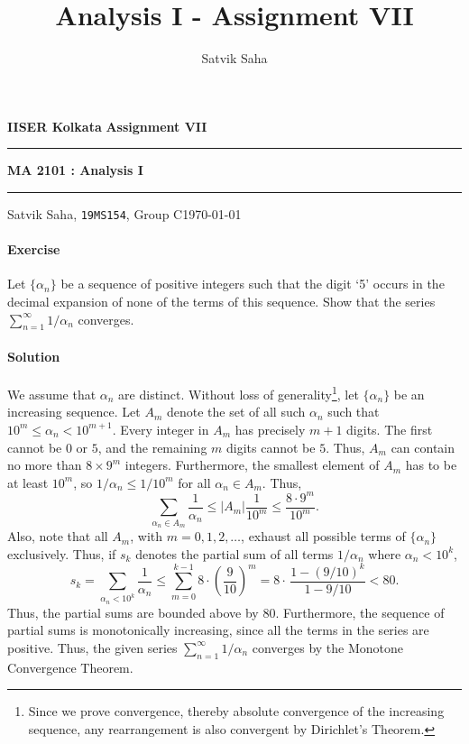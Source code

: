 \documentclass[10pt]{article}
\title{Analysis I - Assignment VII}
\author{Satvik Saha}
\date{}
\newcounter{prob}
\def\problem{\stepcounter{prob}\paragraph{Exercise \arabic{prob}}}
\def\solution{\paragraph{Solution}}
\begin{document}
        \par\textbf{IISER Kolkata} \hfill \textbf{Assignment VII}
        \vspace{3pt}
        \hrule
        \vspace{3pt}
        \begin{center}
                \LARGE{\textbf{MA 2101 : Analysis I}}
        \end{center}
        \vspace{3pt}
        \hrule
        \vspace{3pt}
        Satvik Saha, \texttt{19MS154}, Group C\hfill\today
        \vspace{20pt}

        \problem Let $\{\alpha_n\}$ be a sequence of positive integers such that the digit `5' occurs in the decimal expansion of none of the terms
        of this sequence. Show that the series $\sum_{n = 1}^\infty 1 /\alpha_n$ converges.

        \solution We assume that $\alpha_n$ are distinct. Without loss of generality\footnote{
                Since we prove convergence, thereby absolute convergence of the increasing sequence, any rearrangement is also convergent
                by Dirichlet's Theorem.
        }, let $\{\alpha_n\}$ be an increasing sequence.
        Let $A_m$ denote the set of all such $\alpha_n$ such that $10^m \leq \alpha_n < 10^{m + 1}$. Every integer in $A_m$ has 
        precisely $m + 1$ digits. The first cannot be $0$ or $5$, and the remaining $m$ digits cannot be $5$.
        Thus, $A_m$ can contain no more than $8\times 9^m$ integers. Furthermore, the smallest element of $A_m$ has to be at least $10^m$, so
        $1 /\alpha_n \leq 1 /10^m$ for all $\alpha_n \in A_m$. Thus,
        \[
                \sum_{\alpha_n \in A_m} \frac{1}{\alpha_n} \leq |A_m|\frac{1}{10^m} \leq \frac{8\cdot 9^m}{10^m}.
        \]
        Also, note that all $A_m$, with $m = 0, 1, 2, \dots$, exhaust all possible terms of $\{\alpha_n\}$ exclusively. Thus,
        if $s_k$ denotes the partial sum of all terms $1 /\alpha_n$ where $\alpha_n < 10^k$,
        \[
                s_k = \sum_{\alpha_n < 10^k}\frac{1}{\alpha_n} \leq \sum_{m = 0}^{k - 1} 8\cdot\left(\frac{9}{10}\right)^m = 
                        8\cdot\,\frac{1 - (9 /10)^k}{1 - 9 /10} < 80.
        \]
        Thus, the partial sums are bounded above by $80$. Furthermore, the sequence of partial sums is monotonically increasing, since all the terms
        in the series are positive. Thus, the given series $\sum_{n = 1}^\infty 1 /\alpha_n$ converges by the Monotone Convergence Theorem.
\end{document}
